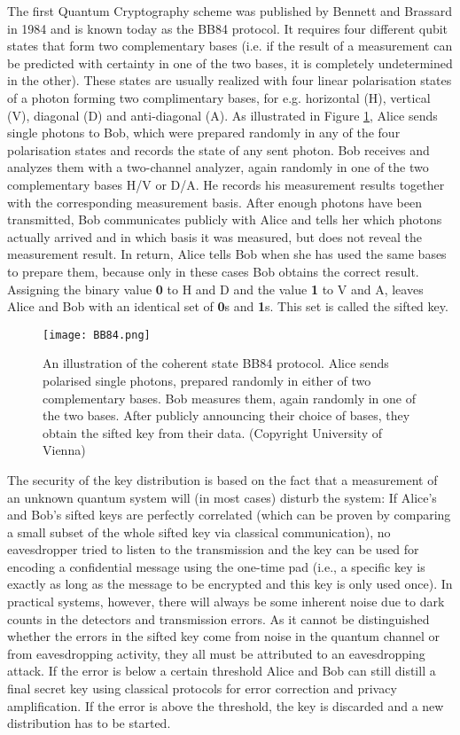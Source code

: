 \documentclass{article}
\begin{document}
The first Quantum Cryptography scheme was published by Bennett and Brassard in 1984 \cite{Bennett:1984wv} and is known today as the BB84 protocol. It requires four different qubit states that form two complementary bases (i.e. if the result of a measurement can be predicted with certainty in one of the two bases, it is completely undetermined in the other). These states are usually realized with four linear polarisation states of a photon forming two complimentary bases, for e.g. horizontal (H), vertical (V), diagonal (D) and anti-diagonal (A). As illustrated in Figure \ref{fig:bb84_protocol}, Alice sends single photons to Bob, which were prepared randomly in any of the four polarisation states and records the state of any sent photon. Bob receives and analyzes them with a two-channel analyzer, again randomly in one of the two complementary bases H/V or D/A. He records his measurement results together with the corresponding measurement basis. After enough photons have been transmitted, Bob communicates publicly with Alice and tells her which photons actually arrived and in which basis it was measured, but does not reveal the measurement result. In return, Alice tells Bob when she has used the same bases to prepare them, because only in these cases Bob obtains the correct result. Assigning the binary value \textbf{0} to H and D and the value \textbf{1} to V and A, leaves Alice and Bob with an identical set of \textbf{0}s and \textbf{1}s. This set is called the sifted key.

\begin{figure}[h!]
\centering
\texttt{[image: BB84.png]}
\caption{An illustration of the coherent state BB84 protocol. Alice sends polarised single photons, prepared randomly in either of two complementary bases. Bob measures them, again randomly in one of the two bases. After publicly announcing their choice of bases, they obtain the sifted key from their data. (Copyright University of Vienna)}
\label{fig:bb84_protocol}
\end{figure}

The security of the key distribution is based on the fact that a measurement of an unknown quantum system will (in most cases) disturb the system: If Alice's and Bob's sifted keys are perfectly correlated (which can be proven by comparing a small subset of the whole sifted key via classical communication), no eavesdropper tried to listen to the transmission and the key can be used for encoding a confidential message using the one-time pad (i.e., a specific key is exactly as long as the message to be encrypted and this key is only used once). In practical systems, however, there will always be some inherent noise due to dark counts in the detectors and transmission errors. As it cannot be distinguished whether the errors in the sifted key come from noise in the quantum channel or from eavesdropping activity, they all must be attributed to an eavesdropping attack. If the error is below a certain threshold Alice and Bob can still distill a final secret key using classical protocols for error correction and privacy amplification. If the error is above the threshold, the key is discarded and a new distribution has to be started. 
\end{document}
